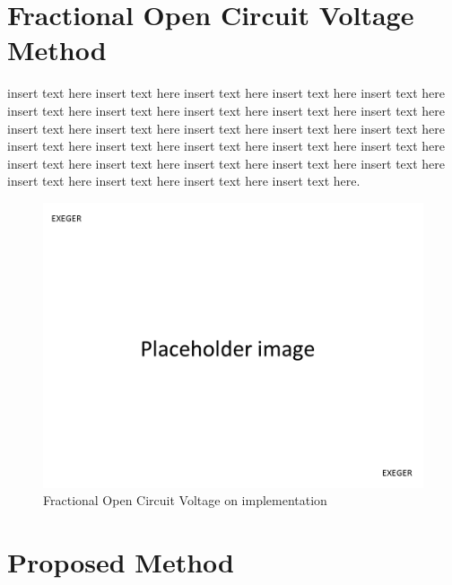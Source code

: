  \section{Fractional Open Circuit Voltage Method }
 insert text here insert text here insert text here insert text here insert text here
 insert text here insert text here insert text here insert text here insert text here insert text here insert text here insert text here insert text here insert text here insert text here insert text here insert text here insert text here insert text here insert text here insert text here insert text here insert text here insert text here insert text here insert text here insert text here insert text here.   \\
 \begin{figure}[H]
  \begin{center}
  \includegraphics[width=\textwidth]{images/pacehold}
  \caption{ Fractional Open Circuit Voltage on implementation}
  \label{fig:Frac_oc_result}
  \end{center}
  \end{figure}
\section{Proposed Method }


